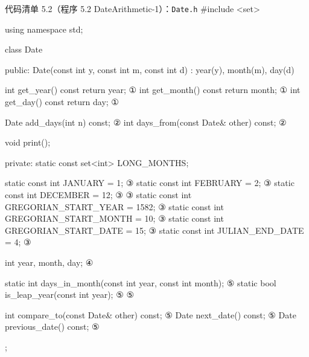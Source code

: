 \begin{codeboxt}{代码清单 5.2（程序 5.2 DateArithmetic-1）：\texttt{Date.h}}
#include <set>

using namespace std;

class Date
{
public:
    Date(const int y, const int m, const int d)
        : year(y), month(m), day(d) {}

    int get_year()  const { return year; }                       ①
    int get_month() const { return month; }                      ①
    int get_day()   const { return day; }                        ①

    Date add_days(int n) const;                                  ②
    int days_from(const Date& other) const;                      ②
          
    void print();

private:
    static const set<int> LONG_MONTHS;

    static const int JANUARY  = 1;                               ③
    static const int FEBRUARY = 2;                               ③
    static const int DECEMBER = 12;                              ③
                                                                 ③
    static const int GREGORIAN_START_YEAR = 1582;                ③
    static const int GREGORIAN_START_MONTH = 10;                 ③
    static const int GREGORIAN_START_DATE = 15;                  ③
    static const int JULIAN_END_DATE = 4;                        ③

    int year, month, day;                                        ④

    static int days_in_month(const int year, const int month);   ⑤
    static bool is_leap_year(const int year);                    ⑤
                                                                 ⑤

    int compare_to(const Date& other) const;                     ⑤
    Date next_date() const;                                      ⑤
    Date previous_date() const;                                  ⑤
};
\end{codeboxt}
\par
{}\par
{}\par
{}\par
{}\par

